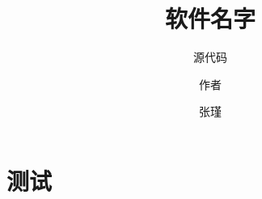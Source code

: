 \documentclass{ldrbook}
\begin{document}
\title{软件名字}
\subtitle{源代码}
\author{作者}

\author{张瑾}

\maketitle

\frontmatter

\mainmatter

\chapter{测试}








\end{document}
